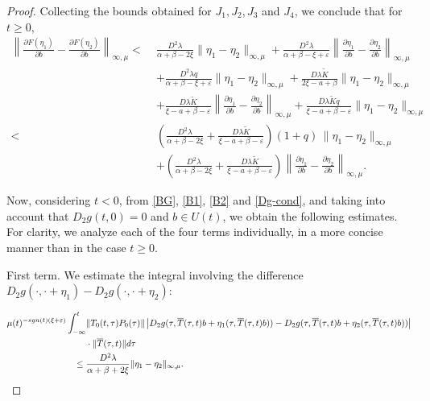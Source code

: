 \documentclass[10pt,a4paper]{amsart}
\begin{document}
\begin{proof}
\noindent
Collecting the bounds obtained for \( J_1, J_2, J_3 \) and \( J_4 \), we conclude that for \( t \geq 0 \),
\begin{align}
\left\|\frac{\partial F(\eta_1)}{\partial b} - \frac{\partial F(\eta_2)}{\partial b} \right\|_{\infty,\mu} 
<\;& \frac{D^2\lambda}{\alpha+\beta-2\xi} \|\eta_1 - \eta_2\|_{\infty,\mu} 
+ \frac{D^2\lambda}{\alpha+\beta-\xi+\varepsilon} 
  \left\| \frac{\partial \eta_1}{\partial b} - \frac{\partial \eta_2}{\partial b} \right\|_{\infty,\mu} \nonumber\\
&+ \frac{D^2\lambda q}{\alpha+\beta-\xi+\varepsilon} \|\eta_1 - \eta_2\|_{\infty,\mu} 
+ \frac{D\lambda\tilde{K}}{2\xi - a + \beta} \|\eta_1 - \eta_2\|_{\infty,\mu} \nonumber\\
&+ \frac{D\lambda\tilde{K}}{\xi - a + \beta - \varepsilon} 
  \left\| \frac{\partial \eta_1}{\partial b} - \frac{\partial \eta_2}{\partial b} \right\|_{\infty,\mu} 
+ \frac{D\lambda\tilde{K} q}{\xi - a + \beta - \varepsilon} \|\eta_1 - \eta_2\|_{\infty,\mu} \nonumber\\[0.5em]
<\;& \left( \frac{D^2\lambda}{\alpha+\beta-2\xi} + \frac{D\lambda\tilde{K}}{\xi - a + \beta - \varepsilon} \right) (1+q)\, \|\eta_1 - \eta_2\|_{\infty,\mu} \nonumber\\
&+ \left( \frac{D^2\lambda}{\alpha+\beta-2\xi} + \frac{D\lambda\tilde{K}}{\xi - a + \beta - \varepsilon} \right) 
  \left\| \frac{\partial \eta_1}{\partial b} - \frac{\partial \eta_2}{\partial b} \right\|_{\infty,\mu}. \label{Dfn12-tmayorcero}
\end{align}

Now, considering $t<0$, from \eqref{BG}, \eqref{B1}, \eqref{B2} and \eqref{Dg-cond}, and taking into account that $D_2g(t,0)=0$ and $b \in U(t)$, we obtain the following estimates. For clarity, we analyze each of the four terms individually, in a more concise manner than in the case $t \geq 0$.


\medskip
\noindent
First term. We estimate the integral involving the difference $D_2g(\cdot, \cdot + \eta_1) - D_2g(\cdot, \cdot + \eta_2)$:

\begin{equation*}
\begin{split}
\mu(t)^{-\textnormal{sgn}(t)(\xi+\varepsilon)} \int_{-\infty}^{t} & \|T_0(t,\tau)P_0(\tau)\|
\left| D_2g(\tau,\overline{T}(\tau,t)b+\eta_1(\tau,\overline{T}(\tau,t)b)) 
- D_2g(\tau,\overline{T}(\tau,t)b+\eta_2(\tau,\overline{T}(\tau,t)b)) \right|
\\
& \cdot \|\overline{T}(\tau,t)\| d\tau
\\
\leq \; & \frac{D^2 \lambda}{\alpha+\beta+2\xi} \|\eta_1 - \eta_2\|_{\infty,\mu}.
\end{split}
\end{equation*}


\end{proof}
\end{document}
